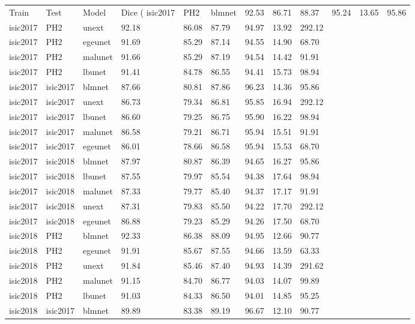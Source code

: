 \begin{tabular}{lllllllll}
\toprule
Train & Test & Model & Dice (%
\midrule
isic2017 & PH2 & blmnet & 92.53 & 86.71 & 88.37 & 95.24 & 13.65 & 95.86 \\
isic2017 & PH2 & unext & 92.18 & 86.08 & 87.79 & 94.97 & 13.92 & 292.12 \\
isic2017 & PH2 & egeunet & 91.69 & 85.29 & 87.14 & 94.55 & 14.90 & 68.70 \\
isic2017 & PH2 & malunet & 91.66 & 85.29 & 87.19 & 94.54 & 14.42 & 91.91 \\
isic2017 & PH2 & lbunet & 91.41 & 84.78 & 86.55 & 94.41 & 15.73 & 98.94 \\
isic2017 & isic2017 & blmnet & 87.66 & 80.81 & 87.86 & 96.23 & 14.36 & 95.86 \\
isic2017 & isic2017 & unext & 86.73 & 79.34 & 86.81 & 95.85 & 16.94 & 292.12 \\
isic2017 & isic2017 & lbunet & 86.60 & 79.25 & 86.75 & 95.90 & 16.22 & 98.94 \\
isic2017 & isic2017 & malunet & 86.58 & 79.21 & 86.71 & 95.94 & 15.51 & 91.91 \\
isic2017 & isic2017 & egeunet & 86.01 & 78.66 & 86.58 & 95.94 & 15.53 & 68.70 \\
isic2017 & isic2018 & blmnet & 87.97 & 80.87 & 86.39 & 94.65 & 16.27 & 95.86 \\
isic2017 & isic2018 & lbunet & 87.55 & 79.97 & 85.54 & 94.38 & 17.64 & 98.94 \\
isic2017 & isic2018 & malunet & 87.33 & 79.77 & 85.40 & 94.37 & 17.17 & 91.91 \\
isic2017 & isic2018 & unext & 87.31 & 79.83 & 85.50 & 94.22 & 17.70 & 292.12 \\
isic2017 & isic2018 & egeunet & 86.88 & 79.23 & 85.29 & 94.26 & 17.50 & 68.70 \\
isic2018 & PH2 & blmnet & 92.33 & 86.38 & 88.09 & 94.95 & 12.66 & 90.77 \\
isic2018 & PH2 & egeunet & 91.91 & 85.67 & 87.55 & 94.66 & 13.59 & 63.33 \\
isic2018 & PH2 & unext & 91.84 & 85.46 & 87.40 & 94.93 & 14.39 & 291.62 \\
isic2018 & PH2 & malunet & 91.15 & 84.70 & 86.77 & 94.03 & 14.07 & 99.89 \\
isic2018 & PH2 & lbunet & 91.03 & 84.33 & 86.50 & 94.01 & 14.85 & 95.25 \\
isic2018 & isic2017 & blmnet & 89.89 & 83.38 & 89.19 & 96.67 & 12.10 & 90.77 \\

\end{tabular}

